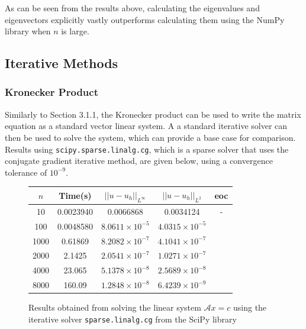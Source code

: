 \documentclass{article}
\numberwithin{equation}{section}
\begin{document}
As can be seen from the results above, calculating the eigenvalues and eigenvectors explicitly vastly outperforms calculating them using the NumPy library when $n$ is large.

\subsection{Iterative Methods}

\subsubsection{Kronecker Product}
Similarly to Section 3.1.1, the Kronecker product can be used to write the matrix equation as a standard vector linear system. A a standard iterative solver can then be used to solve the system, which can provide a base case for comparison. Results using \texttt{scipy.sparse.linalg.cg}, which is a sparse solver that uses the conjugate gradient iterative method, are given below, using a convergence tolerance of $10^{-9}$.

\begin{figure}
\begin{table}[H]
\centering
\begin{tabular}{|c|c|c|c|c|}
\hline
$n$ & Time(s) & $|| u - u_h ||_{L^{\infty}}$ &$|| u - u_h ||_{L^{2}}$ & eoc \\
\hline
10 & 0.0023940 & 0.0066868 & 0.0034124 & - \\
100 & 0.0048580 & $8.0611 \times 10^{-5}$ & $4.0315 \times 10^{-5}$ & \\
1000 & 0.61869 & $8.2082 \times 10^{-7}$ & $4.1041 \times 10^{-7}$ & \\
2000 & 2.1425 & $2.0541 \times 10^{-7}$ & $1.0271 \times 10^{-7}$ & \\
4000 & 23.065 & $5.1378 \times 10^{-8}$ & $2.5689 \times 10^{-8}$ & \\
8000 & 160.09 & $1.2848 \times 10^{-8}$ & $6.4239 \times 10^{-9}$ & \\
\hline
\end{tabular}
\end{table}
\caption{Results obtained from solving the linear system $\mathcal{A} x = c$ using the iterative solver  \texttt{sparse.linalg.cg} from the SciPy library}
\end{figure}
\end{document}
